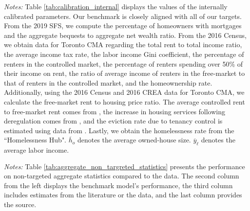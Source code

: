 \documentclass[parskip=full]{article}
\newenvironment{fignote2}[1]
{
\par
\medskip
\begin{minipage}{#1}
\footnotesize
}
{
\end{minipage}
}
\begin{document}
\begin{table}[H]
    \centering
    \caption{Internally assigned parameter values}
    \vspace{-0.5cm}
    \label{tab:calibration_internal}
    
    \vspace{-0.45cm}
    \begin{fignote2}{1\textwidth}
    \textit{Notes:} Table \ref{tab:calibration_internal} displays the values of the internally calibrated parameters. Our benchmark is closely aligned with all of our targets. From the 2019 SFS, we compute the percentage of homeowners with mortgages and the aggregate bequests to aggregate net wealth ratio. From the 2016 Census, we obtain data for Toronto CMA regarding the total rent to total income ratio, the average income tax rate, the labor income Gini coefficient, the percentage of renters in the controlled market, the percentage of renters spending over 50\% of their income on rent, the ratio of average income of renters in the free-market to that of renters in the controlled market, and the homeownership rate. Additionally, using the 2016 Census and 2016 CREA data for Toronto CMA, we calculate the free-market rent to housing price ratio. The average controlled rent to free-market rent comes from \citet{zhang-gou}, the increase in housing services following deregulation comes from \citet{sims-2007}, and the eviction rate due to tenancy control is estimated using data from \citet{LeonIveniuk2020}. Lastly, we obtain the homelessness rate from the ``Homelessness Hub". $\overline{h}_{o}$ denotes the average owned-house size. $\overline{y}_{\ell}$ denotes the average labor income. %
    \end{fignote2}
\end{table}

\begin{table}[H]
    \centering
    \caption{Aggregate non-targeted statistics}
    \vspace{-0.5cm}
    \label{tab:aggregate_non_targreted_statistics}  
    \vspace{-0.45cm}
    \begin{fignote2}{0.74\textwidth}
      \textit{Notes:} Table \ref{tab:aggregate_non_targreted_statistics} presents the performance on non-targeted aggregate statistics compared to the data. The second column from the left displays the benchmark model's performance, the third column includes estimates from the literature or the data, and the last column provides the source.
    \end{fignote2}
\end{table}
\end{document}
